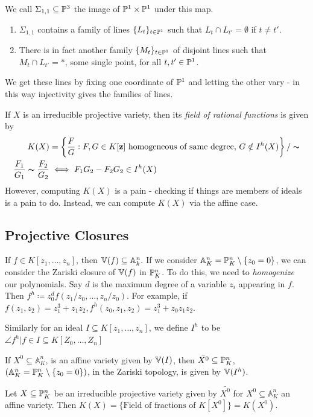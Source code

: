\documentclass[10pt,a4paper,rgb]{article}
\newcommand{\A}{\mathbb{A}}
\begin{document}
We call $\Sigma_{1,1} \subseteq \P^3$ the image of $\P^1 \times \P^1$ under this map.
\begin{enumerate}
\item $\Sigma_{1,1}$ contains a family of lines $\{L_t\}_{t \in \P^1}$ such that $L_t \cap L_{t'} = \emptyset$ if $t \neq t'$.
\item There is in fact another family $\{M_t\}_{t \in \P^1}$ of disjoint lines such that $M_t \cap L_{t'} = \ast$, some single point, for all $t, t' \in \P^1$.
\end{enumerate}
We get these lines by fixing one coordinate of $\P^1$ and letting the other vary - in this way injectivity gives the families of lines.

If $X$ is an irreducible projective variety, then its \emph{field of rational functions} is given by
\begin{align*}
K(X) &= \left\{ \frac{F}{G} : F, G \in K[\mathbf{z}] \text{ homogeneous of same degree, } G \notin I^h(X)\right\}/\thicksim\\
\frac{F_1}{G_1} \thicksim \frac{F_2}{G_2} & \iff F_1G_2 - F_2G_2 \in I^h(X)
\end{align*}
However, computing $K(X)$ is a pain - checking if things are members of ideals is a pain to do. Instead, we can compute $K(X)$ via the affine case.

\subsection{Projective Closures}
If $f \in K[z_1, \ldots, z_n]$, then $\V(f) \subseteq \A^n_k.$ If we consider $\A_K^n=\P_K^n\setminus \{z_0 =0\}$, we can consider the Zariski closure of $\V(f)$ in $\P^n_K$. To do this, we need to \emph{homogenize} our polynomials. Say $d$ is the maximum degree of a variable $z_i$ appearing in $f$. Then $f^h \coloneqq z_0^d f(z_1/z_0, \ldots, z_n/z_0)$. For example, if $f(z_1,z_2) = z_1^3 + z_1z_2, f^h(z_0,z_1,z_2) = z_1^3 + z_0z_1z_2$.

Similarly for an ideal $I \subseteq K[z_1, \ldots, z_n]$, we define $I^h$ to be $\angle{f^h | f \in I} \subseteq K[Z_0, \ldots, Z_n]$

\begin{lemma}
If $X^0 \subseteq \A^n_K$, is an affine variety given by $\V(I)$, then $\bar{X^0} \subseteq \P^n_K$, $(\A^n_K = \P^n_K \setminus \{z_0 = 0\})$, in the Zariski topology, is given by $\V(I^h)$.
\end{lemma}
\begin{proposition}
Let $X \subseteq \P^n_K$ be an irreducible projective variety given by $\bar{X^0}$ for $X^0 \subseteq \A^n_K$ an affine variety. Then $K(X) = \{\text{Field of fractions of }K[X^0]\} = K(X^0)$.
\end{proposition}
\end{document}
